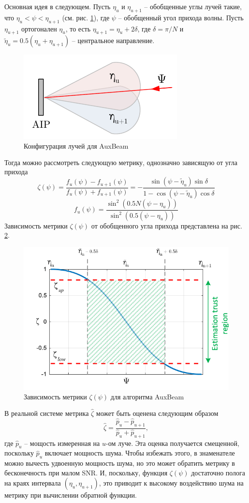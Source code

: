 Основная идея в следующем. Пусть $\eta_u$ и $\eta_{u+1}$ -- обобщенные углы
лучей такие, что $\eta_u<\psi<\eta_{u+1}$ (см. рис. \ref{fig:4.14}), где $\psi$
-- обобщенный угол прихода волны.  Пусть $\eta_{u+1}$ ортогонален $\eta_u$, то
есть $\eta_{u+1} = \eta_u + 2\delta$, где $\delta = \pi/N$  и $\tilde \eta_u =
    0.5 (\eta_u + \eta_{u+1})$ -- центральное направление.
\begin{figure}[h!]
    \centering
    \includegraphics[width=0.5\linewidth]{figs/fig4.14}
    \caption{Конфигурация лучей для AuxBeam}
    \label{fig:4.14}
\end{figure}
Тогда можно рассмотреть следующую метрику, однозначно зависящую от угла прихода
\begin{equation}
    \label{eq:4.37}
    \zeta(\psi) = \frac{f_u(\psi) - f_{u+1}(\psi)}{f_u(\psi) + f_{u+1}(\psi)} = - \frac{\sin(\psi - \tilde \eta_u) \sin \delta}{1 - \cos(\psi - \tilde \eta_u) \cos \delta}
\end{equation}
\begin{equation}
    \label{eq:4.38}
    f_u(\psi) = \frac{\sin^2 (0.5 N (\psi - \eta_u))}{\sin^2(0.5 (\psi - \eta_u))}
\end{equation}
Зависимость метрики $\zeta(\psi)$  от обобщенного угла прихода представлена на
рис. \ref{fig:4.15}.
\begin{figure}[h!]
    \centering
    \includegraphics[width=0.5\linewidth]{figs/fig4.15}
    \caption{Зависимость метрики $\zeta(\psi)$ для алгоритма AuxBeam}
    \label{fig:4.15}
\end{figure}
В реальной системе метрика $\hat \zeta$ может быть оценена следующим образом
\begin{equation}
    \label{eq:4.39}
    \hat \zeta = \frac{\hat p_u - \hat p_{u+1}}{ \hat p_u + \hat p_{u+1} },
\end{equation}
где $\hat p_u$ -- мощость измеренная на $u$-ом луче. Эта оценка получается смещенной, поскольку $\hat p_u$ включает мощность шума.
Чтобы избежать этого, в знаменателе можно вычесть удвоенную мощность шума, но это может обратить метрику в бесконечность при малом SNR.
И, поскольку, функция $\zeta(\psi)$ достаточно полога на краях интервала $(\eta_u, \eta_{u+1})$, это приводит к высокому
воздействию шума на метрику при вычислении обратной функции.

